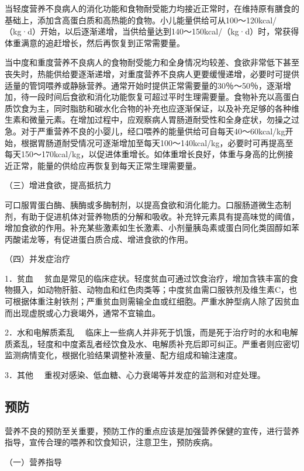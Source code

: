 当轻度营养不良病人的消化功能和食物耐受能力均接近正常时，在维持原有膳食的基础上，添加含高蛋白质和高热能的食物。小儿能量供给可从100～120kcal/（kg·d）开始，以后逐渐递增，当供给量达到140～150kcal/（kg·d）时，常获得体重满意的追赶增长，然后再恢复到正常需要量。

当中度和重度营养不良病人的食物耐受能力和全身情况均较差、食欲非常低下甚至丧失时，热能供给要逐渐递增，对重度营养不良病人更要缓慢递增，必要时可提供适量的管饲喂养或静脉营养。通常开始时提供正常需要量的30％～50％，逐渐增加，待一段时间后食欲和消化功能恢复可超过平时生理需要量。食物补充以高蛋白质饮食为主，同时脂肪和碳水化合物的补充也应逐渐保证，以及补充足够的各种维生素和微量元素。在增加过程中，应观察病人胃肠道耐受性和全身症状，勿操之过急。对于严重营养不良的小婴儿，经口喂养的能量供给可自每天40～60kcal/kg开始，根据胃肠道耐受情况可逐渐增加至每天100～140kcal/kg，必要时可再提高至每天150～170kcal/kg，以促进体重增长。如体重增长良好，体重与身高的比例接近正常，能量的供给应再恢复到每天正常生理需要量。

（三）增进食欲，提高抵抗力

可口服胃蛋白酶、胰酶或多酶制剂，以提高食欲和消化能力。口服肠道微生态制剂，有助于促进机体对营养物质的分解和吸收。补充锌元素具有提高味觉的阈值，增加食欲的作用。补充某些激素如生长激素、小剂量胰岛素或蛋白同化类固醇如苯丙酸诺龙等，有促进蛋白质合成、增进食欲的作用。

（四）并发症治疗

{1．贫血}
　贫血是常见的临床症状。轻度贫血可通过饮食治疗，增加含铁丰富的食物摄入，如动物肝脏、动物血和红色肉类等；中度贫血需口服铁剂及维生素C，也可根据体重注射铁剂；严重贫血则需输全血或红细胞。严重水肿型病人除了因贫血而出现虚脱或心力衰竭外，通常不宜输血。

{2．水和电解质紊乱}
　临床上一些病人并非死于饥饿，而是死于治疗时的水和电解质紊乱，轻度和中度紊乱者经饮食及水、电解质补充后即可纠正。严重者则应密切监测病情变化，根据化验结果调整补液量、配方组成和输注速度。

{3．其他} 　重视对感染、低血糖、心力衰竭等并发症的监测和对症处理。

\hypertarget{text00003.htmlux5cux23mllj15}{%
\subsection{预防}\label{text00003.htmlux5cux23mllj15}}

营养不良的预防至关重要，预防工作的重点应该是加强营养保健的宣传，进行营养指导，宣传合理的喂养和饮食知识，注意卫生，预防疾病。

（一）营养指导

